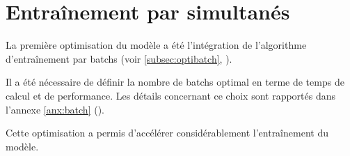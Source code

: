 \section{Entraînement par  simultanés}
La première optimisation du modèle a été l'intégration de l'algorithme d'entraînement par \glspl{batch} (voir \autoref{subsec:optibatch}, ).

Il a été nécessaire de définir la nombre de \glspl{batch} optimal en terme de temps de calcul et de performance. Les détails concernant ce choix sont rapportés dans l'annexe \ref{anx:batch} ().

Cette optimisation a permis d'accélérer considérablement l'entraînement du modèle.